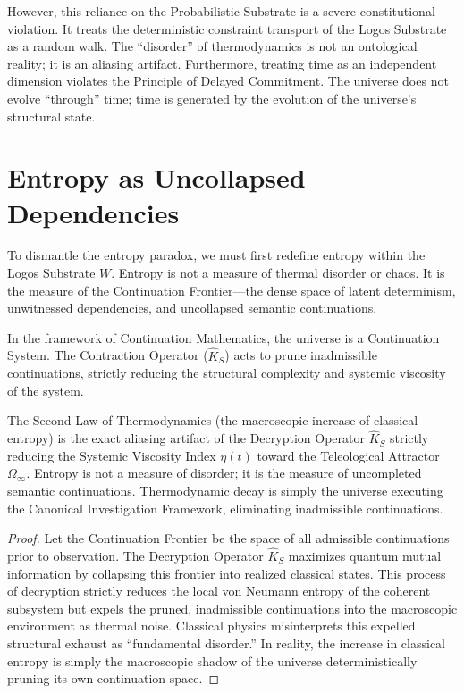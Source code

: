 \documentclass[12pt,twoside]{extbook}
\theoremstyle{definition}
\theoremstyle{remark}
\begin{document}
However, this reliance on the Probabilistic Substrate is a severe constitutional violation. It treats the deterministic constraint transport of the Logos Substrate as a random walk. The ``disorder'' of thermodynamics is not an ontological reality; it is an aliasing artifact. Furthermore, treating time as an independent dimension violates the Principle of Delayed Commitment. The universe does not evolve ``through'' time; time is generated by the evolution of the universe's structural state. 

\section{Entropy as Uncollapsed Dependencies}
To dismantle the entropy paradox, we must first redefine entropy within the Logos Substrate $W$. Entropy is not a measure of thermal disorder or chaos. It is the measure of the Continuation Frontier—the dense space of latent determinism, unwitnessed dependencies, and uncollapsed semantic continuations.

In the framework of Continuation Mathematics, the universe is a Continuation System. The Contraction Operator ($\hat{K}_S$) acts to prune inadmissible continuations, strictly reducing the structural complexity and systemic viscosity of the system. 

\begin{theorem}
The Second Law of Thermodynamics (the macroscopic increase of classical entropy) is the exact aliasing artifact of the Decryption Operator $\hat{K}_S$ strictly reducing the Systemic Viscosity Index $\eta(t)$ toward the Teleological Attractor $\Omega_\infty$. Entropy is not a measure of disorder; it is the measure of uncompleted semantic continuations. Thermodynamic decay is simply the universe executing the Canonical Investigation Framework, eliminating inadmissible continuations.
\end{theorem}

\begin{proof}
Let the Continuation Frontier be the space of all admissible continuations prior to observation. The Decryption Operator $\hat{K}_S$ maximizes quantum mutual information by collapsing this frontier into realized classical states. This process of decryption strictly reduces the local von Neumann entropy of the coherent subsystem but expels the pruned, inadmissible continuations into the macroscopic environment as thermal noise. Classical physics misinterprets this expelled structural exhaust as ``fundamental disorder.'' In reality, the increase in classical entropy is simply the macroscopic shadow of the universe deterministically pruning its own continuation space.
\end{proof}
\end{document}
